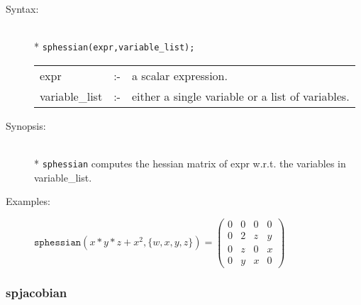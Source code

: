 \begin{description}
\item[Syntax:]\mbox{}\\*
 \texttt{sphessian(expr,variable\_list);}\\[2mm]
\begin{tabular}{l l l}
expr           &:-& a scalar expression. \\
variable\_list &:-& either a single variable or a list of variables.
\end{tabular}

\item[Synopsis:]\mbox{}\\*
                \texttt{sphessian} computes the hessian matrix of expr w.r.t.
                the variables in variable\_list. 

\item[Examples:]
\begin{flushleft}  
\hspace*{0.1in}
\begin{math}        
\texttt{sphessian}(x*y*z+x^2,\{w,x,y,z\})  = 
\begin{pmatrix} 0 & 0 & 0 & 0 \\ 0 & 2 & z & y \\ 0 & z & 0 
& x \\ 0 & y & x & 0
\end{pmatrix} 
\end{math}  
\end{flushleft}
\end{description}

\subsubsection{spjacobian}
\label{sparse:spjacobian}

